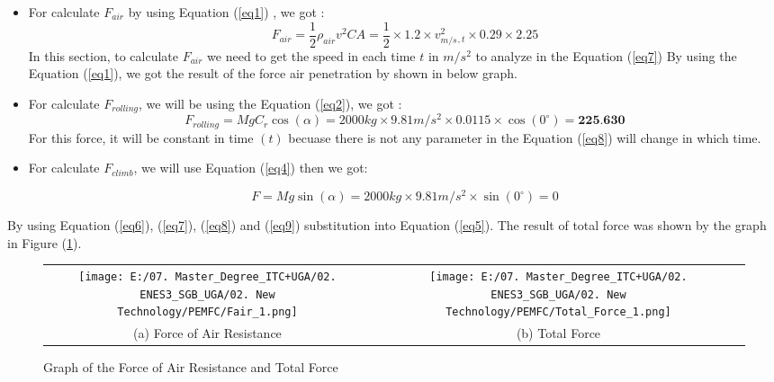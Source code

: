 \documentclass[12pt,a4paper]{article}
\numberwithin{equation}{section}
\begin{document}
	\begin{itemize}[label=-]
		\item For calculate $F_{air}$ by using Equation (\ref{eq1}) , we got :
			\begin{equation}
				F_{air} = \frac{1}{2}\rho_{air}v^2CA = \frac{1}{2}\times1.2\times 	v^2_{m/s}_{,t}\times0.29\times 2.25 \label{eq7}
			\end{equation}
			In this section, to calculate $F_{air}$ we need to get the speed in each time $t$ in $m/s^2$ to analyze in the Equation (\ref{eq7})
			By using the Equation (\ref{eq1}), we got the result of the force air penetration by shown in below graph.
		\item For calculate $F_{rolling}$, we will be using the Equation (\ref{eq2}), we got :
			\begin{equation}
				F_{rolling} = MgC_r\cos(\alpha) = 2000kg\times9.81m/s^2\times0.0115\times\cos(0^\circ) = \textbf{225.630} \label{eq8}
			\end{equation}
			For this force, it will be constant in time $(t)$ becuase there is not any parameter in the Equation (\ref{eq8}) will change in which time.
			
			
		\item For calculate $F_{climb}$, we will use Equation (\ref{eq4}) then we got:
		
			\begin{equation}
				F = Mg\sin(\alpha) = 2000kg \times 9.81m/s^2 \times \sin(0^\circ) = 0 \label{eq9}
			\end{equation}		
	\end{itemize}

	By using Equation (\ref{eq6}), (\ref{eq7}), (\ref{eq8}) and (\ref{eq9}) substitution into Equation (\ref{eq5}). The result of total force was shown by the graph in Figure (\ref{4}).
	
	\begin{figure}[htbp]
		\centering
		\begin{tabular}{c @{\qquad} c}
			\texttt{[image: E:/07. Master\_Degree\_ITC+UGA/02. ENES3\_SGB\_UGA/02. New Technology/PEMFC/Fair\_1.png]} &
			\texttt{[image: E:/07. Master\_Degree\_ITC+UGA/02. ENES3\_SGB\_UGA/02. New Technology/PEMFC/Total\_Force\_1.png]} \\
			
			\small (a) Force of Air Resistance & \small (b) Total Force
		\end{tabular}
		
		\caption{\small Graph of the  Force of Air Resistance and Total Force}
		\label{4}
	\end{figure}
		
\end{document}
